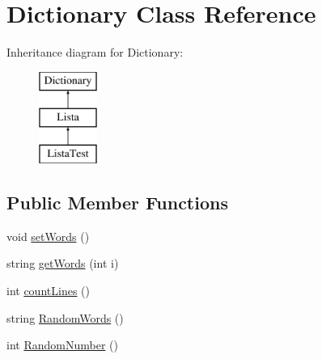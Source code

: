 \hypertarget{class_dictionary}{\section{Dictionary Class Reference}
\label{class_dictionary}
}
Inheritance diagram for Dictionary\-:\begin{figure}[H]
\begin{center}
\leavevmode
\includegraphics[height=3.000000cm]{class_dictionary}
\end{center}
\end{figure}
\subsection*{Public Member Functions}
\begin{DoxyCompactItemize}
\item 
void \hyperlink{class_dictionary_a5f7c40f501a0cf324dfea5a38d974eed}{set\-Words} ()
\item 
string \hyperlink{class_dictionary_a5bd0a1d493e52af07cf4bc3bbb1453d6}{get\-Words} (int i)
\item 
int \hyperlink{class_dictionary_a3466672e02319a215179f127fe0ae530}{count\-Lines} ()
\item 
string \hyperlink{class_dictionary_ad9c09209b38b2141be5438fd3ac14ebe}{Random\-Words} ()
\item 
int \hyperlink{class_dictionary_a267251a4e33289be24d0a945746aa54e}{Random\-Number} ()
\end{DoxyCompactItemize}


